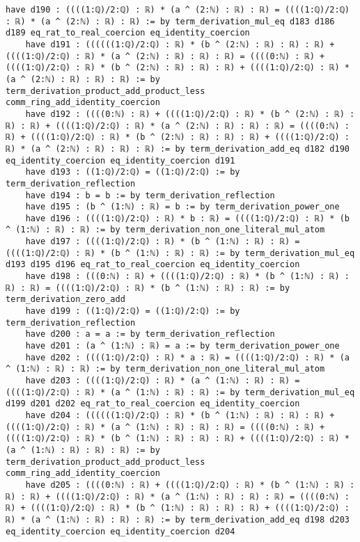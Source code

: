 \documentclass{article}
\begin{document}
\begin{tcolorbox}[colback=white!10, width=\linewidth]
\begin{lstlisting}[language=Lean4]
    have d190 : ((((1:ℚ)/2:ℚ) : ℝ) * (a ^ (2:ℕ) : ℝ) : ℝ) = ((((1:ℚ)/2:ℚ) : ℝ) * (a ^ (2:ℕ) : ℝ) : ℝ) := by term_derivation_mul_eq d183 d186 d189 eq_rat_to_real_coercion eq_identity_coercion
    have d191 : ((((((1:ℚ)/2:ℚ) : ℝ) * (b ^ (2:ℕ) : ℝ) : ℝ) : ℝ) + ((((1:ℚ)/2:ℚ) : ℝ) * (a ^ (2:ℕ) : ℝ) : ℝ) : ℝ) = ((((0:ℕ) : ℝ) + ((((1:ℚ)/2:ℚ) : ℝ) * (b ^ (2:ℕ) : ℝ) : ℝ) : ℝ) + ((((1:ℚ)/2:ℚ) : ℝ) * (a ^ (2:ℕ) : ℝ) : ℝ) : ℝ) := by term_derivation_product_add_product_less comm_ring_add_identity_coercion
    have d192 : ((((0:ℕ) : ℝ) + ((((1:ℚ)/2:ℚ) : ℝ) * (b ^ (2:ℕ) : ℝ) : ℝ) : ℝ) + ((((1:ℚ)/2:ℚ) : ℝ) * (a ^ (2:ℕ) : ℝ) : ℝ) : ℝ) = ((((0:ℕ) : ℝ) + ((((1:ℚ)/2:ℚ) : ℝ) * (b ^ (2:ℕ) : ℝ) : ℝ) : ℝ) + ((((1:ℚ)/2:ℚ) : ℝ) * (a ^ (2:ℕ) : ℝ) : ℝ) : ℝ) := by term_derivation_add_eq d182 d190 eq_identity_coercion eq_identity_coercion d191
    have d193 : ((1:ℚ)/2:ℚ) = ((1:ℚ)/2:ℚ) := by term_derivation_reflection
    have d194 : b = b := by term_derivation_reflection
    have d195 : (b ^ (1:ℕ) : ℝ) = b := by term_derivation_power_one
    have d196 : ((((1:ℚ)/2:ℚ) : ℝ) * b : ℝ) = ((((1:ℚ)/2:ℚ) : ℝ) * (b ^ (1:ℕ) : ℝ) : ℝ) := by term_derivation_non_one_literal_mul_atom
    have d197 : ((((1:ℚ)/2:ℚ) : ℝ) * (b ^ (1:ℕ) : ℝ) : ℝ) = ((((1:ℚ)/2:ℚ) : ℝ) * (b ^ (1:ℕ) : ℝ) : ℝ) := by term_derivation_mul_eq d193 d195 d196 eq_rat_to_real_coercion eq_identity_coercion
    have d198 : (((0:ℕ) : ℝ) + ((((1:ℚ)/2:ℚ) : ℝ) * (b ^ (1:ℕ) : ℝ) : ℝ) : ℝ) = ((((1:ℚ)/2:ℚ) : ℝ) * (b ^ (1:ℕ) : ℝ) : ℝ) := by term_derivation_zero_add
    have d199 : ((1:ℚ)/2:ℚ) = ((1:ℚ)/2:ℚ) := by term_derivation_reflection
    have d200 : a = a := by term_derivation_reflection
    have d201 : (a ^ (1:ℕ) : ℝ) = a := by term_derivation_power_one
    have d202 : ((((1:ℚ)/2:ℚ) : ℝ) * a : ℝ) = ((((1:ℚ)/2:ℚ) : ℝ) * (a ^ (1:ℕ) : ℝ) : ℝ) := by term_derivation_non_one_literal_mul_atom
    have d203 : ((((1:ℚ)/2:ℚ) : ℝ) * (a ^ (1:ℕ) : ℝ) : ℝ) = ((((1:ℚ)/2:ℚ) : ℝ) * (a ^ (1:ℕ) : ℝ) : ℝ) := by term_derivation_mul_eq d199 d201 d202 eq_rat_to_real_coercion eq_identity_coercion
    have d204 : ((((((1:ℚ)/2:ℚ) : ℝ) * (b ^ (1:ℕ) : ℝ) : ℝ) : ℝ) + ((((1:ℚ)/2:ℚ) : ℝ) * (a ^ (1:ℕ) : ℝ) : ℝ) : ℝ) = ((((0:ℕ) : ℝ) + ((((1:ℚ)/2:ℚ) : ℝ) * (b ^ (1:ℕ) : ℝ) : ℝ) : ℝ) + ((((1:ℚ)/2:ℚ) : ℝ) * (a ^ (1:ℕ) : ℝ) : ℝ) : ℝ) := by term_derivation_product_add_product_less comm_ring_add_identity_coercion
    have d205 : ((((0:ℕ) : ℝ) + ((((1:ℚ)/2:ℚ) : ℝ) * (b ^ (1:ℕ) : ℝ) : ℝ) : ℝ) + ((((1:ℚ)/2:ℚ) : ℝ) * (a ^ (1:ℕ) : ℝ) : ℝ) : ℝ) = ((((0:ℕ) : ℝ) + ((((1:ℚ)/2:ℚ) : ℝ) * (b ^ (1:ℕ) : ℝ) : ℝ) : ℝ) + ((((1:ℚ)/2:ℚ) : ℝ) * (a ^ (1:ℕ) : ℝ) : ℝ) : ℝ) := by term_derivation_add_eq d198 d203 eq_identity_coercion eq_identity_coercion d204

\end{lstlisting}
\end{tcolorbox}
\end{document}
